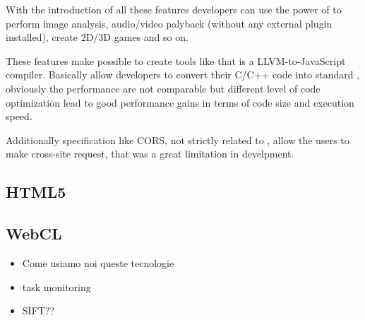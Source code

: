 With the introduction of all these features developers can use the power of \js{} to perform image analysis,
audio/video palyback (without any external plugin installed), create 2D/3D games and so on.

These features make possible to create tools like  that is a LLVM-to-JavaScript compiler.
Basically allow developers to convert their C/C++ code into standard \js{}, obviously the performance
are not comparable but different level of code optimization lead to good performance gains in terms of
code size and execution speed.



Additionally specification like \ac{CORS}, not strictly related to \js{}, allow the users to make
cross-site request, that was a great limitation in \js{} develpment.

\subsection{HTML5}
\label{sec:bg:web:html5}



\subsection{WebCL}
\label{sec:bg:web:webcl}



\begin{itemize}
	\item Come usiamo noi queste tecnologie
	\item task monitoring
	\item SIFT??
\end{itemize}